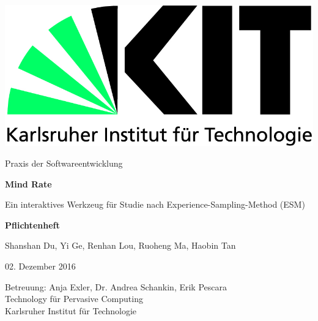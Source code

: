 \documentclass[a4paper]{scrreprt}
\begin{document}

    \begin{flushright}
        \includegraphics[scale = 0.7]{kit-logo.jpg}\\[0.5cm]
    \end{flushright}
    \vspace*{2cm}

    \begin{center} \large

        Praxis der Softwareentwicklung
        \vspace * {1.5cm}

        \textbf{\huge Mind Rate}

        \vspace*{1cm}

        {\Large Ein interaktives Werkzeug f\"ur Studie nach Experience-Sampling-Method (ESM)}

        \vspace*{1cm}

        \textbf{\Large Pflichtenheft}
        \vspace*{2cm}

        Shanshan Du, Yi Ge, Renhan Lou, Ruoheng Ma, Haobin Tan
        \vspace*{1cm}

        02. Dezember 2016
        \vspace*{2.5cm}


        Betreuung: Anja Exler, Dr. Andrea Schankin, Erik Pescara\\[1cm]
        Technology f\"ur Pervasive Computing\\[0.5cm]
        Karlsruher Institut für Technologie
    \end{center}
\end{document}
